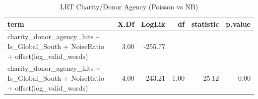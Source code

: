 \begin{table}[ht]
\centering
\begin{tabular}{lrrrrr}
  \hline
term & X.Df & LogLik & df & statistic & p.value \\ 
  \hline
charity\_donor\_agency\_hits \~{} Is\_Global\_South + NoiseRatio + offset(log\_valid\_words) & 3.00 & -255.77 &  &  &  \\ 
  charity\_donor\_agency\_hits \~{} Is\_Global\_South + NoiseRatio + offset(log\_valid\_words) & 4.00 & -243.21 & 1.00 & 25.12 & 0.00 \\ 
   \hline
\end{tabular}
\caption{LRT Charity/Donor Agency (Poisson vs NB)} 
\end{table}
